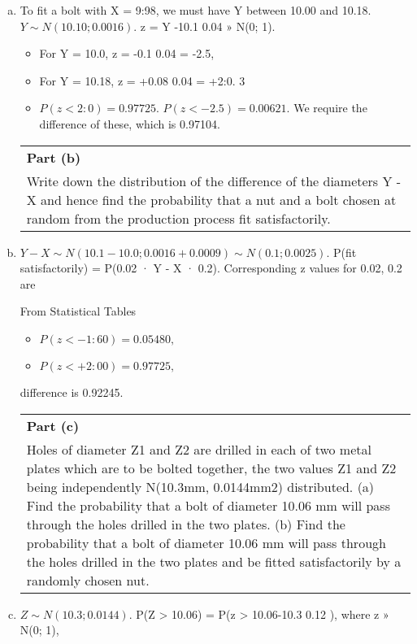 \documentclass[a4paper,12pt]{article}
\begin{document}
\begin{enumerate}[(a)]
\item To fit a bolt with X = 9:98, we must have Y between 10.00 and 10.18.
$Y \sim N(10.10; 0.0016)$. z = Y -10.1
0.04 » N(0; 1).
\begin{itemize}
    \item For Y = 10.0, z = -0.1
0.04 = -2.5,
\item For Y = 10.18, z = +0.08
0.04 = +2:0.
3
\item $P(z < 2:0) = 0.97725$. $P(z < -2.5) = 0.00621$.
We require the difference of these, which is 0.97104.
\end{itemize}

  \begin{table}[ht!]
     \centering
     \begin{tabular}{|p{15cm}|}
     \hline  
\noindent \textbf{Part (b)}\\Write down the distribution of the difference of the diameters Y - X and hence find the probability that a nut and a bolt chosen at random from the production process fit satisfactorily.
\\ \hline
      \end{tabular}
    \end{table}
    
\item  $Y - X \sim N(10.1 - 10.0; 0.0016 + 0.0009) \sim N(0.1; 0.0025).$
P(fit satisfactorily) = P(0.02 · Y - X · 0.2). Corresponding z values for
0.02, 0.2 are 
From Statistical Tables

\begin{itemize}
\item $P(z < -1:60) = 0.05480,$
\item $P(z < +2:00) = 0.97725,$
\end{itemize}
difference is 0.92245.
\newpage
 \begin{table}[ht!]
\centering
\begin{tabular}{|p{15cm}|}
\hline  
\noindent \textbf{Part (c)}\\ Holes of diameter Z1 and Z2 are drilled in each of two metal plates which
are to be bolted together, the two values Z1 and Z2 being independently N(10.3mm, 0.0144mm2) distributed.
(a) Find the probability that a bolt of diameter 10.06 mm will pass through the holes drilled in the two plates.
(b) Find the probability that a bolt of diameter 10.06 mm will pass through the holes drilled in the two plates and be fitted satisfactorily by a randomly chosen nut. \\ \hline 
\end{tabular}
\end{table}
\item  $Z \sim N(10.3; 0.0144)$. P(Z > 10.06) = P(z > 10.06-10.3
0.12 ), where z » N(0; 1),


\end{enumerate}
\end{document}

